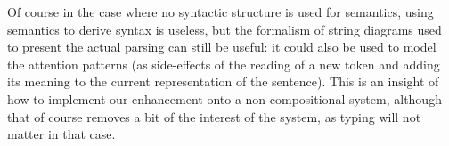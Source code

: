 Of course in the case where no syntactic structure is used for semantics,
using semantics to derive syntax is useless, but the formalism of string
diagrams used to present the actual parsing can still be useful:
it could also be used to model the attention patterns (as side-effects of the
reading of a new token and adding its meaning to the current representation
of the sentence).
This is an insight of how to implement our enhancement onto a non-compositional
system, although that of course removes a bit of the interest of the system, as
typing will not matter in that case.
